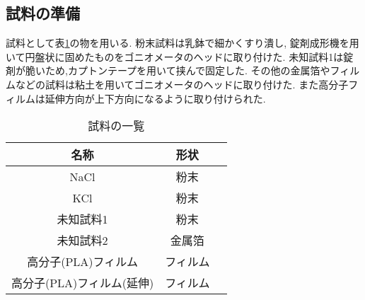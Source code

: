 \subsection{試料の準備}
試料として表\ref{tab:siryou}の物を用いる.
粉末試料は乳鉢で細かくすり潰し,
錠剤成形機を用いて円盤状に固めたものをゴニオメータのヘッドに取り付けた.
未知試料1は錠剤が脆いため,カプトンテープを用いて挟んで固定した.
その他の金属箔やフィルムなどの試料は粘土を用いてゴニオメータのヘッドに取り付けた.
また高分子フィルムは延伸方向が上下方向になるように取り付けられた.
\begin{table}[h]
  \caption{試料の一覧}
  \label{tab:siryou}
  \centering
  \begin{tabular}{ccc}
  \hline
  名称&形状\\
  \hline \hline
  NaCl&粉末\\
  KCl&粉末\\
  未知試料1&粉末\\
  未知試料2&金属箔\\
  高分子(PLA)フィルム&フィルム\\
  高分子(PLA)フィルム(延伸)&フィルム\\
  \hline
  \end{tabular}
\end{table}
